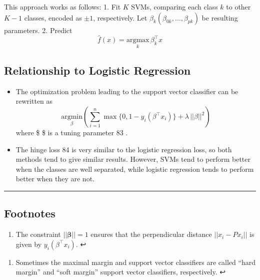 \documentclass[11pt]{article}
\providecommand{\tightlist}{%
      \setlength{\itemsep}{0pt}\setlength{\parskip}{0pt}}
\begin{document}
    This approach works as follows: 1. Fit \(K\) SVMs, comparing each class
\(k\) to other \(K-1\) classes, encoded as \(\pm 1\), respectively. Let
\(\beta_k (\beta_{0k}, \dots, \beta_{pk})\) be resulting parameters. 2.
Predict \[\hat{f}(x) = \underset{k}{\text{argmax}}\, \beta_k^\top x\]

    \hypertarget{relationship-to-logistic-regression}{%
\subsection{Relationship to Logistic
Regression}\label{relationship-to-logistic-regression}}

    \begin{itemize}
\tightlist
\item
  The optimization problem leading to the support vector classifier can
  be rewritten as
  \[\underset{\beta}{\text{argmin}}\left(\sum_{i = 1}^n \max\{0, 1 - y_i(\beta^\top x_i)\} + \lambda\,||\beta||^2\right)\]
  where \$\lambda {} \$ is a tuning parameter 83 .
\item
  The hinge loss 84 is very similar to the logistic regression loss, so
  both methods tend to give similar results. However, SVMs tend to
  perform better when the classes are well separated, while logistic
  regression tends to perform better when they are not.
\end{itemize}

    \begin{center}\rule{0.5\linewidth}{\linethickness}\end{center}

\hypertarget{footnotes}{%
\subsection{Footnotes}\label{footnotes}}

    \hypertarget{foot78}{}
\begin{enumerate}
\def\labelenumi{\arabic{enumi}.}
\setcounter{enumi}{77}
\tightlist
\item
  The constraint \(|| \boldsymbol{\beta} || = 1\) ensures that the
  perpendicular distance \(||x_i - P x_i||\) is given by
  \(y_i(\beta^\top x_i)\). ↩
\end{enumerate}

\hypertarget{foot79}{}
\begin{enumerate}
\def\labelenumi{\arabic{enumi}.}
\setcounter{enumi}{78}
\tightlist
\item
  Sometimes the maximal margin and support vector classifiers are called
  ``hard margin'' and ``soft margin'' support vector classifiers,
  respectively. ↩
\end{enumerate}
\end{document}
